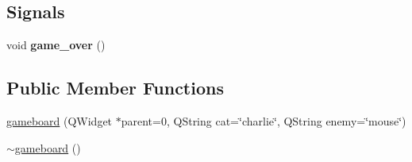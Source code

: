 \subsection*{Signals}
\begin{DoxyCompactItemize}
\item 
\hypertarget{classgameboard_a7bed0743b0684228902113bd840b79ba}{}void {\bfseries game\+\_\+over} ()\label{classgameboard_a7bed0743b0684228902113bd840b79ba}

\end{DoxyCompactItemize}
\subsection*{Public Member Functions}
\begin{DoxyCompactItemize}
\item 
\hyperlink{classgameboard_a45936725b978fc6548d0ad9e62b70d95}{gameboard} (Q\+Widget $\ast$parent=0, Q\+String cat=\char`\"{}charlie\char`\"{}, Q\+String enemy=\char`\"{}mouse\char`\"{})
\item 
\hypertarget{classgameboard_ac10e30eecd45bb004a592f97bd0e398f}{}\hyperlink{classgameboard_ac10e30eecd45bb004a592f97bd0e398f}{$\sim$gameboard} ()\label{classgameboard_ac10e30eecd45bb004a592f97bd0e398f}


\end{DoxyCompactItemize}

